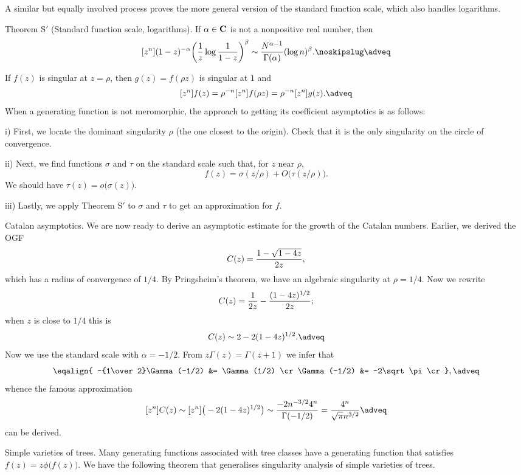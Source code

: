 A similar but equally involved process proves the more general version of the standard function scale,
which also handles logarithms.

\parenproclaim Theorem S$'$ (Standard function scale, logarithms).
If $\alpha\in {\bf C}$ is not a nonpositive real number, then
$$[z^n](1-z)^{-\alpha}\bigg({1\over z}\log {1\over 1-z}\bigg)^\beta
    \sim {N^{\alpha - 1}\over \Gamma(\alpha)}(\log n)^\beta.\noskipslug\adveq$$

If $f(z)$ is singular at $z=\rho$, then $g(z) = f(\rho z)$ is singular at $1$ and
$$[z^n] f(z) = \rho^{-n} [z^n] f(\rho z) = \rho^{-n} [z^n] g(z).\adveq$$
When a generating function is not meromorphic, the approach to getting its coefficient asymptotics is
as follows:
\medskip
\item{i)} First, we locate the dominant singularity $\rho$ (the one closest to the origin).
Check that it is the only singularity on the circle of convergence.
\smallskip
\item{ii)} Next, we find functions $\sigma$ and $\tau$ on the standard scale such that,
for $z$ near $\rho$,
$$f(z) = \sigma(z/\rho) + O\big(\tau(z/\rho)\big).$$
We should have $\tau(z) = o\big(\sigma(z)\big)$.
\smallskip
\item{iii)} Lastly, we apply Theorem S$'$ to $\sigma$ and $\tau$ to get an approximation for $f$.
\medskip

\boldlabel Catalan asymptotics. We are now ready to derive an asymptotic estimate for the growth
of the Catalan numbers. Earlier, we derived the OGF
$$C(z) = {1 - \sqrt{1-4z} \over 2z},$$
which has a radius of convergence of $1/4$. By Pringsheim's theorem, we have an algebraic
singularity at $\rho = 1/4$. Now we rewrite
$$C(z) = {1\over 2z} - {(1-4z)^{1/2} \over 2z};$$
when $z$ is close to $1/4$ this is
$$C(z) \sim 2 - 2(1-4z)^{1/2}.\adveq$$
Now we use the standard scale with $\alpha = -1/2$. From $z\Gamma(z) = \Gamma(z+1)$ we infer that
$$\eqalign{
-{1\over 2}\Gamma(-1/2) &= \Gamma(1/2) \cr
\Gamma(-1/2) &= -2\sqrt \pi \cr
},\adveq$$
whence the famous approximation
$$[z^n]C(z) \sim [z^n]\big(-2(1-4z)^{1/2}\big)
  \sim {-2n^{-3/2}4^n \over \Gamma(-1/2)} = {4^n \over \sqrt \pi n^{3/2}}\adveq$$
can be derived.
\medskip

\boldlabel Simple varieties of trees. Many generating functions associated with tree classes
have a generating function that satisfies $f(z) = z\phi\big(f(z)\big)$. We have the following
theorem that generalises singularity analysis of simple varieties of trees.


